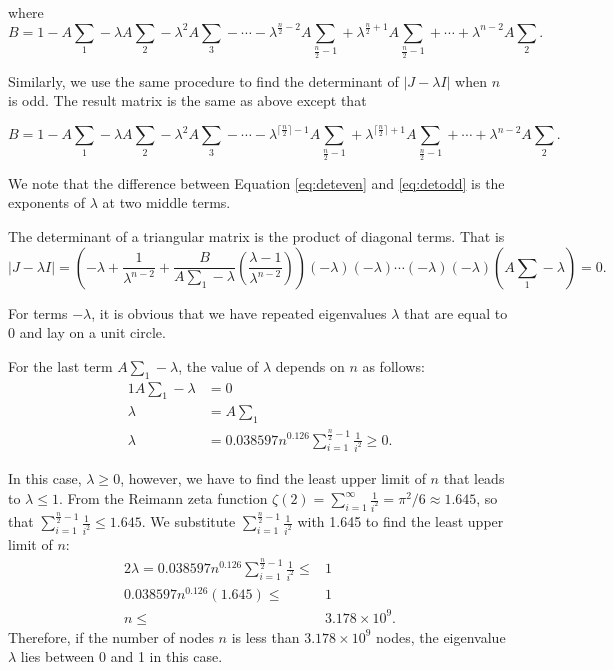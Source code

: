 \endgroup

where 
\begin{equation}
\label{eq:deteven}
B = 1-A\sum\limits_{1} - \lambda A\sum\limits_{2} - \lambda^{2}A\sum\limits_{3} - \cdots - \lambda^{\frac{n}{2}-2} A\sum\limits_{\frac{n}{2}-1} + \lambda^{\frac{n}{2}+1} A\sum\limits_{\frac{n}{2}-1} + \cdots + \lambda^{n-2}A\sum\limits_2. 
\end{equation}

Similarly, we use the same procedure to find the determinant of $|J-\lambda I|$ when $n$ is odd. The result matrix is the same as above except that

\begin{equation}
\label{eq:detodd}
B = 1-A\sum\limits_{1} - \lambda A\sum\limits_{2} - \lambda^{2}A\sum\limits_{3} - \cdots - \lambda^{\lceil\frac{n}{2}\rceil-1} A\sum\limits_{\frac{n}{2}-1} + \lambda^{\lceil\frac{n}{2}\rceil+1} A\sum\limits_{\frac{n}{2}-1} + \cdots + \lambda^{n-2}A\sum\limits_2. 
\end{equation}

We note that the difference between Equation \ref{eq:deteven} and \ref{eq:detodd} is the exponents of $\lambda$ at two middle terms.

The determinant of a triangular matrix is the product of diagonal terms. That is
\begin{equation}
|J-\lambda I| = \left(-\lambda + \frac{1}{\lambda^{n-2}} + \frac{B}{A\sum\limits_{1}-\lambda}\left(\frac{\lambda-1}{\lambda^{n-2}}\right)\right)(-\lambda)(-\lambda)\cdots(-\lambda)(-\lambda)\left(A\sum\limits_{1}-\lambda\right) = 0. \nonumber
\end{equation}


For terms $-\lambda$, it is obvious that we have repeated eigenvalues $\lambda$ that are equal to $0$ and lay on a unit circle.

For the last term $A\sum\limits_{1}-\lambda$, the value of $\lambda$ depends on $n$ as follows:
\begin{alignat}{1}
A\sum\limits_{1}-\lambda &= 0 \nonumber \\
\lambda &= A\sum\limits_{1} \nonumber \\
\lambda &= 0.038597n^{0.126}\sum\limits_{i=1}^{\frac{n}{2}-1}{\frac{1}{i^2}} \geq 0.\nonumber 
\end{alignat}

In this case, $\lambda \geq 0$, however, we have to find the least upper limit of $n$ that leads to $\lambda \leq 1$. 
From the Reimann zeta function $\zeta (2) = \sum_{i=1}^{\infty}\frac{1}{i^2} = \pi^2/6 \approx 1.645$, so that $\sum_{i=1}^{\frac{n}{2}-1}\frac{1}{i^2} \leqslant 1.645$. We substitute $\sum_{i=1}^{\frac{n}{2}-1}\frac{1}{i^2}$ with 1.645 to find the least upper limit of $n$:
\begin{alignat}{2}
\lambda = 0.038597n^{0.126}\sum\limits_{i=1}^{\frac{n}{2}-1}{\frac{1}{i^2}} \leq & 1 \nonumber  \\
0.038597n^{0.126}(1.645) \leq & 1 \nonumber \\
n \leq & 3.178 \times 10^9.
\end{alignat}
Therefore, if the number of nodes $n$ is less than $3.178 \times 10^9$ nodes, the eigenvalue $\lambda$ lies between 0 and 1 in this case.


